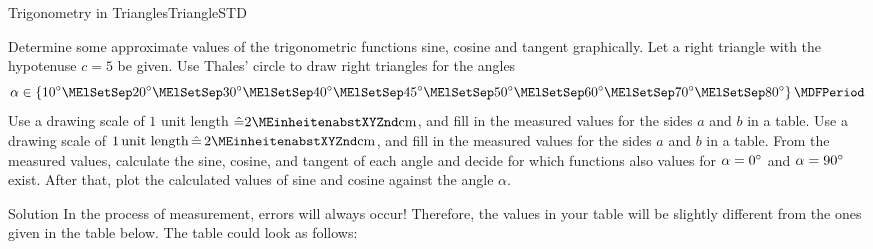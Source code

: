 \begin{MXContent}{Trigonometry in Triangles}{Triangle}{STD}
\begin{MExercise}
Determine some approximate values of the trigonometric functions sine, cosine 
and tangent graphically. Let a right triangle with the hypotenuse $c=5$ be given. 
Use Thales' circle to draw right triangles for the angles
\[ 
\alpha \in \left\{10\MGrad\MElSetSep 20\MGrad\MElSetSep %
30\MGrad\MElSetSep 40\MGrad\MElSetSep 45\MGrad\MElSetSep 50\MGrad\MElSetSep %
60\MGrad\MElSetSep 70\MGrad\MElSetSep 80\MGrad \right\} \MDFPeriod %
\]
\ifttm
Use a drawing scale of $1$ unit length $\hat{=} 2\MEinheit{cm}$, and fill in the 
measured values for the sides $a$ and $b$ in a table. 
\else
Use a drawing scale of $1\,\text{unit length} \,\hat{=}\, 2\MEinheit{cm}$, and fill in the 
measured values for the sides $a$ and $b$ in a table. 
\fi
From the measured values, calculate the sine, cosine, and tangent of each angle
and decide for which functions also values for $\alpha = 0^{\circ}$ 
and $\alpha = 90^{\circ}$ exist. After that, plot the calculated values of sine 
and cosine against the angle $\alpha$.

\begin{MHint}{Solution}
In the process of measurement, errors will always occur! Therefore, the 
values in your table will be slightly different from the ones given in 
the table below. The table could look as follows:


\end{MHint}
\end{MExercise}
\end{MXContent}
